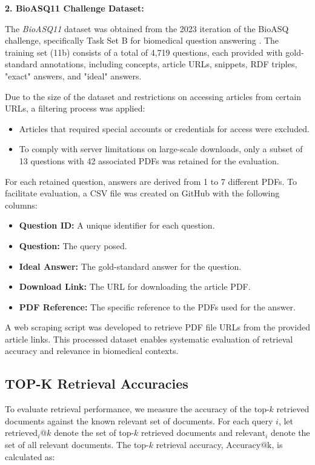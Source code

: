 \documentclass{scrartcl}
\begin{document}
\textbf{2. BioASQ11 Challenge Dataset:}

The \textit{BioASQ11} dataset was obtained from the 2023 iteration of the BioASQ challenge, specifically Task Set B for biomedical question answering \cite{bioasq2023}. The training set (11b) consists of a total of 4,719 questions, each provided with gold-standard annotations, including concepts, article URLs, snippets, RDF triples, "exact" answers, and "ideal" answers.

Due to the size of the dataset and restrictions on accessing articles from certain URLs, a filtering process was applied:
\begin{itemize}
    \item Articles that required special accounts or credentials for access were excluded.
    \item To comply with server limitations on large-scale downloads, only a subset of 13 questions with 42 associated PDFs was retained for the evaluation.
\end{itemize}

For each retained question, answers are derived from 1 to 7 different PDFs. To facilitate evaluation, a CSV file was created on GitHub with the following columns:
\begin{itemize}
    \item \textbf{Question ID:} A unique identifier for each question.
    \item \textbf{Question:} The query posed.
    \item \textbf{Ideal Answer:} The gold-standard answer for the question.
    \item \textbf{Download Link:} The URL for downloading the article PDF.
    \item \textbf{PDF Reference:} The specific reference to the PDFs used for the answer.
\end{itemize}

A web scraping script was developed to retrieve PDF file URLs from the provided article links. This processed dataset enables systematic evaluation of retrieval accuracy and relevance in biomedical contexts.


\subsection{TOP-K Retrieval Accuracies}

To evaluate retrieval performance, we measure the accuracy of the top-\(k\) retrieved documents against the known relevant set of documents. For each query \(i\), let \(\text{retrieved}_i@k\) denote the set of top-\(k\) retrieved documents and \(\text{relevant}_i\) denote the set of all relevant documents. The top-\(k\) retrieval accuracy, \(\text{Accuracy@k}\), is calculated as:
\end{document}
